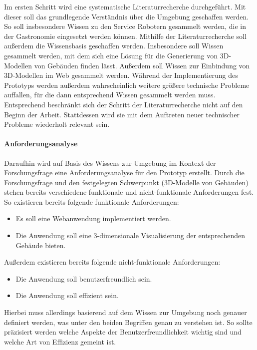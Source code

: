 Im ersten Schritt wird eine systematische Literaturrecherche durchgeführt. Mit dieser soll das grundlegende Verständnis über die Umgebung geschaffen werden. So soll insbesondere Wissen zu den Service Robotern gesammelt werden, die in der Gastronomie eingesetzt werden können. Mithilfe der Literaturrecherche soll außerdem die Wissensbasis geschaffen werden. Insbesondere soll Wissen gesammelt werden, mit dem sich eine Lösung für die Generierung von 3D-Modellen von Gebäuden finden lässt. Außerdem soll Wissen zur Einbindung von 3D-Modellen im Web gesammelt werden. Während der Implementierung des Prototyps werden außerdem wahrscheinlich weitere größere technische Probleme auffallen, für die dann entsprechend Wissen gesammelt werden muss. Entsprechend beschränkt sich der Schritt der Literaturrecherche nicht auf den Beginn der Arbeit. Stattdessen wird sie mit dem Auftreten neuer technischer Probleme wiederholt relevant sein.

\paragraph{Anforderungsanalyse}

Daraufhin wird auf Basis des Wissens zur Umgebung im Kontext der Forschungsfrage eine Anforderungsanalyse für den Prototyp erstellt. Durch die Forschungsfrage und den festgelegten Schwerpunkt (3D-Modelle von Gebäuden) stehen bereits verschiedene funktionale und nicht-funktionale Anforderungen fest. So existieren bereits folgende funktionale Anforderungen:

\begin{itemize}
    \item Es soll eine Webanwendung implementiert werden.
    \item Die Anwendung soll eine 3-dimensionale Visualisierung der entsprechenden Gebäude bieten.
\end{itemize}

\begin{samepage}
Außerdem existieren bereits folgende nicht-funktionale Anforderungen:

\nopagebreak
\begin{itemize}
    \item Die Anwendung soll benutzerfreundlich sein.
    \item Die Anwendung soll effizient sein.
\end{itemize}
\end{samepage}

Hierbei muss allerdings basierend auf dem Wissen zur Umgebung noch genauer definiert werden, was unter den beiden Begriffen genau zu verstehen ist. So sollte  präzisiert werden welche Aspekte der Benutzerfreundlichkeit wichtig sind und welche Art von Effizienz gemeint ist.

